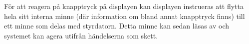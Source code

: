 För att reagera på knapptryck på displayen kan displayen instrueras att flytta
hela sitt interna minne (där information om bland annat knapptryck finns) till
ett minne som delas med styrdatorn. Detta minne kan sedan läsas av och systemet
kan agera utifrån händelserna som skett.

% 
% 
% 
% 
% 
% 

